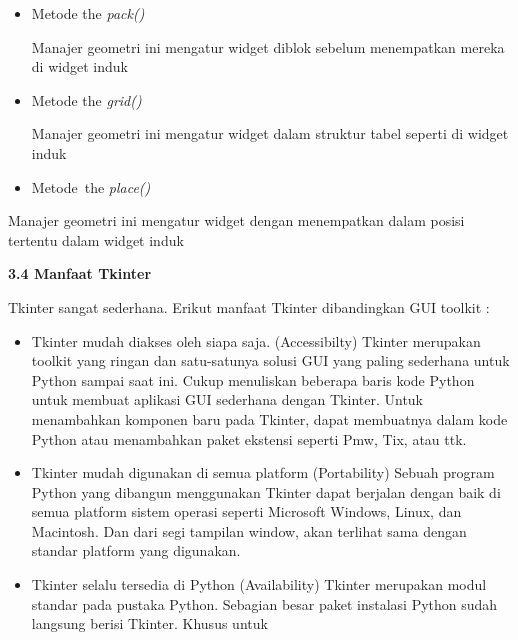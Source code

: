 \begin{itemize}
\noindent 
\begin{itemize}
\item Metode the \textit{pack()} \par
\noindent 
Manajer geometri ini mengatur widget diblok sebelum menempatkan mereka di widget induk \par
\noindent 
\item Metode the \textit{grid()} \par
\noindent 
Manajer geometri ini mengatur widget dalam struktur tabel seperti di widget induk \par
\noindent 
\item Metode~the  \textit{place()}\end{itemize}
 \par
\noindent 
Manajer geometri ini mengatur widget dengan menempatkan dalam posisi tertentu dalam widget induk \par
\vspace{12pt}
\noindent 
\textbf{3.4 Manfaat Tkinter} \par
Tkinter sangat sederhana. Erikut manfaat Tkinter dibandingkan GUI toolkit : \par
\noindent 
\begin{itemize}
\item Tkinter mudah diakses oleh siapa saja. (Accessibilty)\vspace{\baselineskip}
Tkinter merupakan toolkit yang ringan dan satu-satunya solusi GUI yang paling sederhana untuk Python sampai saat ini. Cukup menuliskan 
beberapa baris kode Python untuk membuat aplikasi GUI sederhana dengan Tkinter. Untuk menambahkan komponen baru pada Tkinter, dapat 
membuatnya dalam kode Python atau menambahkan paket ekstensi seperti Pmw, Tix, atau ttk. \par
\noindent 
\item Tkinter mudah digunakan di semua platform (Portability)\vspace{\baselineskip}
Sebuah program Python yang dibangun menggunakan Tkinter dapat berjalan dengan baik di semua platform sistem operasi seperti Microsoft 
Windows, Linux, dan Macintosh. Dan dari segi tampilan window, akan terlihat sama dengan standar platform yang digunakan. \par
\noindent 
\item Tkinter selalu tersedia di Python (Availability)\vspace{\baselineskip}
Tkinter merupakan modul standar pada pustaka Python. Sebagian besar paket instalasi Python sudah langsung berisi Tkinter. Khusus untuk 

\end{itemize}
\end{itemize}
